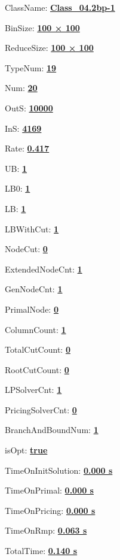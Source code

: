 \documentclass[11pt]{article}
\begin{document}
\pagestyle{empty}


ClassName: \underline{\textbf{Class_04.2bp-1}}
\par
BinSize: \underline{\textbf{100 × 100}}
\par
ReduceSize: \underline{\textbf{100 × 100}}
\par
TypeNum: \underline{\textbf{19}}
\par
Num: \underline{\textbf{20}}
\par
OutS: \underline{\textbf{10000}}
\par
InS: \underline{\textbf{4169}}
\par
Rate: \underline{\textbf{0.417}}
\par
UB: \underline{\textbf{1}}
\par
LB0: \underline{\textbf{1}}
\par
LB: \underline{\textbf{1}}
\par
LBWithCut: \underline{\textbf{1}}
\par
NodeCut: \underline{\textbf{0}}
\par
ExtendedNodeCnt: \underline{\textbf{1}}
\par
GenNodeCnt: \underline{\textbf{1}}
\par
PrimalNode: \underline{\textbf{0}}
\par
ColumnCount: \underline{\textbf{1}}
\par
TotalCutCount: \underline{\textbf{0}}
\par
RootCutCount: \underline{\textbf{0}}
\par
LPSolverCnt: \underline{\textbf{1}}
\par
PricingSolverCnt: \underline{\textbf{0}}
\par
BranchAndBoundNum: \underline{\textbf{1}}
\par
isOpt: \underline{\textbf{true}}
\par
TimeOnInitSolution: \underline{\textbf{0.000 s}}
\par
TimeOnPrimal: \underline{\textbf{0.000 s}}
\par
TimeOnPricing: \underline{\textbf{0.000 s}}
\par
TimeOnRmp: \underline{\textbf{0.063 s}}
\par
TotalTime: \underline{\textbf{0.140 s}}
\par
\newpage
\end{document}
